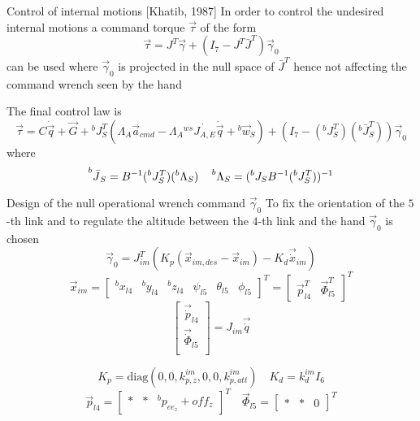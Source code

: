\begin{frame}{Control of internal motions [Khatib, 1987]}
 In order to control the undesired internal motions a command torque $\vec{\tau}$ of the form
 \[
 \vec{\tau} = J^{T} \vec{\gamma} + (I_7 - J^{T}\bar{J}^{T}) \vec{\gamma}_{0}
 \]
 can be used where $\vec{\gamma}_{0}$ is projected in the null space of $\bar{J}^{T}$ hence not affecting
 the command wrench seen by the hand
 \par
 The final control law is
 \[
 \vec{\tau} = C \dot{\vec{q}} + \vec{G} + {}^{b}J^{T}_{S} ( \Lambda_A \vec{a}_{cmd} - \Lambda_A {}^{ws} \dot{J_{A,E}} \dot{\vec{q}} + {}^b\vec{w}_{S}) +
 (I_7 - ({}^{b}J^{T}_{S}) ({}^{b} \bar{J}^{T}_{S})) \vec{\gamma}_{0}
 \]
where
\[
\prescript{b}{}{\bar{J}}_{S} = B^{-1} ({}^{b} J^{T}_{S}) ({}^{b} \Lambda_{S}) \quad 
\prescript{b}{}{\Lambda}_{S} = ({}^{b} J_{S} B^{-1} ({}^{b} J^{T}_{S}))^{-1}
\]
\end{frame}

\begin{frame}{Design of the null operational wrench command $\vec{\gamma}_{0}$}
  To fix the orientation of the $5$-th link and
  to regulate the altitude between the $4$-th link and the hand 
  $\vec{\gamma}_0$ is chosen
  \[
  \vec{\gamma}_{0} = J_{im} ^{T} (K_p (\vec{x}_{im,des} - \vec{x}_{im} ) - K_d \vec{\dot{x}}_{im})
  \]
  \[
  \vec{x}_{im} =
  \begin{bmatrix}
    {}^{b} x_{l4} & {}^{b} y_{l4} & {}^{b} z_{l4} & \psi_{l5} & \theta_{l5} & \phi_{l5}
  \end{bmatrix}^{T} =
  \begin{bmatrix}
    \vec{p}^{T}_{l4} & \vec{\Phi}^{T}_{l5}
  \end{bmatrix}^{T}
  \]
  \[
  \begin{bmatrix}
  \vec{\dot{p}}_{l4} \\
  \vec{\dot{\Phi}}_{l5} \\
  \end{bmatrix} =
  J_{im} \vec{\dot{q}}
  \]
  \par
  \[
  K_p = \text{diag}(0, 0, k_{p,z}^{im}, 0, 0, k_{p, att}^{im})
  \quad
  K_d = k_{d}^{im} I_{6}
  \]
  \[
  \vec{p}_{l4} =
  \begin{bmatrix}
    * & * & {}^{b} p_{ee_{z}} + off_z
  \end{bmatrix}^{T}
  \quad
  \vec{\Phi}_{l5} =
  \begin{bmatrix}
    * & * & 0
  \end{bmatrix}^{T}
  \]
\end{frame}
